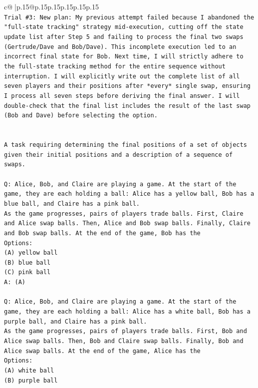 \documentclass{article}
\begin{document}
{\begin{supertabular}{c@{$\;$}|p{.15\linewidth}@{}p{.15\linewidth}p{.15\linewidth}p{.15\linewidth}p{.15\linewidth}p{.15\linewidth}}
{{{\\ 
\texttt{Trial \#3: New plan: My previous attempt failed because I abandoned the "full{-}state tracking" strategy mid{-}execution, cutting off the state update list after Step 5 and failing to process the final two swaps (Gertrude/Dave and Bob/Dave). This incomplete execution led to an incorrect final state for Bob. Next time, I will strictly adhere to the full{-}state tracking method for the entire sequence without interruption. I will explicitly write out the complete list of all seven players and their positions after *every* single swap, ensuring I process all seven steps before deriving the final answer. I will double{-}check that the final list includes the result of the last swap (Bob and Dave) before selecting the option.} \\
\\ 
\\ 
\texttt{A task requiring determining the final positions of a set of objects given their initial positions and a description of a sequence of swaps.} \\
\\ 
\texttt{Q: Alice, Bob, and Claire are playing a game. At the start of the game, they are each holding a ball: Alice has a yellow ball, Bob has a blue ball, and Claire has a pink ball.} \\
\texttt{As the game progresses, pairs of players trade balls. First, Claire and Alice swap balls. Then, Alice and Bob swap balls. Finally, Claire and Bob swap balls. At the end of the game, Bob has the} \\
\texttt{Options:} \\
\texttt{(A) yellow ball} \\
\texttt{(B) blue ball} \\
\texttt{(C) pink ball} \\
\texttt{A: (A)} \\
\\ 
\texttt{Q: Alice, Bob, and Claire are playing a game. At the start of the game, they are each holding a ball: Alice has a white ball, Bob has a purple ball, and Claire has a pink ball.} \\
\texttt{As the game progresses, pairs of players trade balls. First, Bob and Alice swap balls. Then, Bob and Claire swap balls. Finally, Bob and Alice swap balls. At the end of the game, Alice has the} \\
\texttt{Options:} \\
\texttt{(A) white ball} \\
\texttt{(B) purple ball} \\
}}}
\end{supertabular}}
\end{document}
